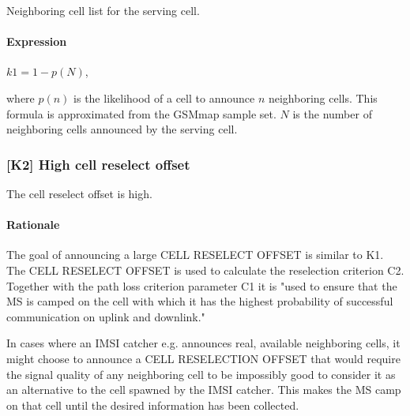 \documentclass[a4paper,11pt,notitlepage,bigheadings,oneside]{scrartcl}
\begin{document}
Neighboring cell list for the serving cell.

\paragraph{Expression}

$k1 = 1 - p(N)$,

where $p(n)$ is the likelihood of a cell to announce $n$ neighboring cells.
This formula is approximated from the GSMmap sample set. $N$ is the number of
neighboring cells announced by the serving cell.


\subsubsection{[K2] High cell reselect offset}

The cell reselect offset is high.

\paragraph{Rationale}

The goal of announcing a large CELL RESELECT OFFSET is similar to K1. The CELL
RESELECT OFFSET is used to calculate the reselection criterion C2. Together
with the path loss criterion parameter C1 it is "used to ensure that the MS is
camped on the cell with which it has the highest probability of successful
communication on uplink and downlink." \cite[6.4]{gsm0508}

In cases where an IMSI catcher e.g. announces real, available neighboring
cells, it might choose to announce a CELL RESELECTION OFFSET that would require
the signal quality of any neighboring cell to be impossibly good to consider it
as an alternative to the cell spawned by the IMSI catcher. This makes the MS
camp on that cell until the desired information has been collected.


%
\end{document}
